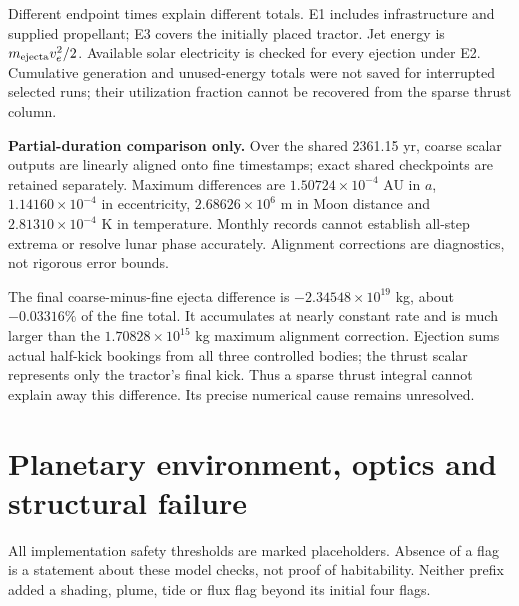 ﻿\documentclass[10pt,a4paper]{article}
\begin{document}
Different endpoint times explain different totals. E1 includes infrastructure and supplied propellant; E3 covers the initially placed tractor. Jet energy is $m_{\rm ejecta}v_e^2/2$. Available solar electricity is checked for every ejection under E2. Cumulative generation and unused-energy totals were not saved for interrupted selected runs; their utilization fraction cannot be recovered from the sparse thrust column.

\textbf{Partial-duration comparison only.} Over the shared 2361.15 yr, coarse scalar outputs are linearly aligned onto fine timestamps; exact shared checkpoints are retained separately. Maximum differences are $1.50724\times10^{-4}$ AU in $a$, $1.14160\times10^{-4}$ in eccentricity, $2.68626\times10^6$ m in Moon distance and $2.81310\times10^{-4}$ K in temperature. Monthly records cannot establish all-step extrema or resolve lunar phase accurately. Alignment corrections are diagnostics, not rigorous error bounds.

The final coarse-minus-fine ejecta difference is $-2.34548\times10^{19}$ kg, about $-0.03316\%$ of the fine total. It accumulates at nearly constant rate and is much larger than the $1.70828\times10^{15}$ kg maximum alignment correction. Ejection sums actual half-kick bookings from all three controlled bodies; the thrust scalar represents only the tractor's final kick. Thus a sparse thrust integral cannot explain away this difference. Its precise numerical cause remains unresolved.
\newpage
\section{Planetary environment, optics and structural failure}
All implementation safety thresholds are marked placeholders. Absence of a flag is a statement about these model checks, not proof of habitability. Neither prefix added a shading, plume, tide or flux flag beyond its initial four flags.
\end{document}
